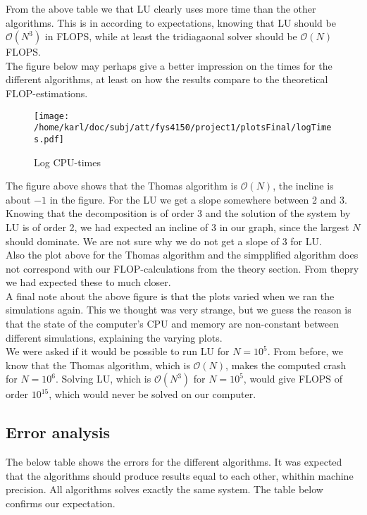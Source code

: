 \documentclass{article}
\begin{document}
From the above table we that LU clearly uses more time than the other algorithms. This is in according to expectations, knowing that LU should be $\mathcal{O}(N^3)$ in FLOPS, while at least the tridiagaonal solver should be $\mathcal{O}(N)$ FLOPS.\\

The figure below may perhaps give a better impression on the times for the different algorithms, at least on how the results compare to the theoretical FLOP-estimations.

\begin{figure}[H]
	\centering
	\texttt{[image: /home/karl/doc/subj/att/fys4150/project1/plotsFinal/logTimes.pdf]}
	\caption{Log CPU-times}
	\label{fig:logtimes}
\end{figure}

The figure above shows that the Thomas algorithm is $\mathcal{O}(N)$, the incline is about $-1$ in the figure. For the LU we get a slope somewhere between 2 and 3. Knowing that the decomposition is of order 3 and the solution of the system by LU is of order 2, we had expected an incline of 3 in our graph, since the largest $N$ should dominate. We are not sure why we do not get a slope of 3 for LU. \\

Also the plot above for the Thomas algorithm and the simpplified algorithm does not correspond with our FLOP-calculations from the theory section. From thepry we had expected these to much closer.\\

A final note about the above figure is that the plots varied when we ran the simulations again. This we thought was very strange, but we guess the reason is that the state of the computer's CPU and memory are non-constant between different simulations, explaining the varying plots.\\

We were asked if it would be possible to run LU for $N=10^5.$ From before, we know that the Thomas algorithm, which is $\mathcal{O}(N)$, makes the computed crash for $N = 10^6$. Solving LU, which is $\mathcal{O}(N^3)$ for $N = 10^5$, would give FLOPS of order $10^15$, which would never be solved on our computer.

\subsection{Error analysis}
The below table shows the errors for the different algorithms. It was expected that the algorithms should produce results equal to each other, whithin machine precision. All algorithms solves exactly the same system. The table below confirms our expectation. 
\end{document}
